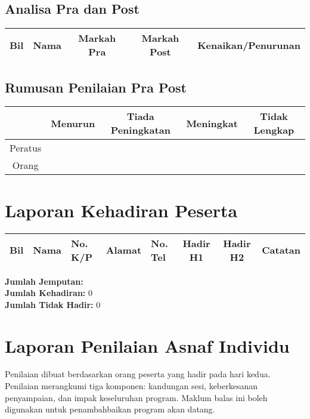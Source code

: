 \documentclass[a4paper,12pt]{article}
\begin{document}
\subsection{Analisa Pra dan Post}
\begin{longtable}{|c|p{6cm}|c|c|c|}
    \hline
    \rowcolor{lightgray}
    \textbf{Bil} & \textbf{Nama} & \textbf{Markah Pra} & \textbf{Markah Post} & \textbf{Kenaikan/Penurunan} \\
    \hline
    \endhead
    
\end{longtable}

\subsection{Rumusan Penilaian Pra Post}
\begin{tabular}{|c|c|c|c|c|}
    \hline
    \rowcolor{lightgray}
    \textbf{} & \textbf{Menurun} & \textbf{Tiada Peningkatan} & \textbf{Meningkat} & \textbf{Tidak Lengkap} \\
    \hline
    Peratus &  &  &  &  \\
    \hline
    Orang &  &  &  &  \\
    \hline
\end{tabular}

\section{Laporan Kehadiran Peserta}
\begin{longtable}{|c|p{4cm}|p{3cm}|p{4cm}|p{2cm}|c|c|p{2cm}|}
    \hline
    \rowcolor{lightgray}
    \textbf{Bil} & \textbf{Nama} & \textbf{No. K/P} & \textbf{Alamat} & \textbf{No. Tel} & \textbf{Hadir H1} & \textbf{Hadir H2} & \textbf{Catatan} \\
    \hline
    \endhead
    
\end{longtable}

\textbf{Jumlah Jemputan:}  \\
\textbf{Jumlah Kehadiran:} 0 \\
\textbf{Jumlah Tidak Hadir:} 0

\section{Laporan Penilaian Asnaf Individu}
Penilaian dibuat berdasarkan  orang peserta yang hadir pada hari kedua. Penilaian merangkumi tiga komponen: kandungan sesi, keberkesanan penyampaian, dan impak keseluruhan program. Maklum balas ini boleh digunakan untuk penambahbaikan program akan datang.
\end{document}
